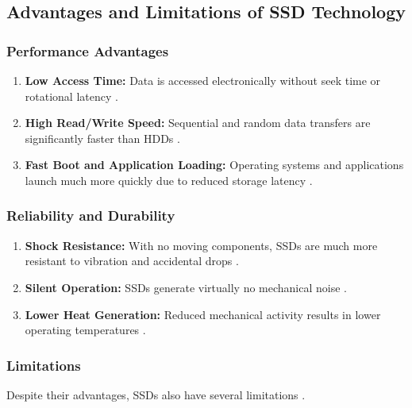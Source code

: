 \subsection{Advantages and Limitations of SSD Technology}

\subsubsection{Performance Advantages}
\begin{enumerate}[label=\roman*.]
    \item \textbf{Low Access Time:} Data is accessed electronically without seek time or rotational latency \cite{openai2026nvmearchitecture}.
    \item \textbf{High Read/Write Speed:} Sequential and random data transfers are significantly faster than HDDs \cite{openai2026nvmearchitecture}.
    \item \textbf{Fast Boot and Application Loading:} Operating systems and applications launch much more quickly due to reduced storage latency \cite{gfg_storage_structure}.
\end{enumerate}

\subsubsection{Reliability and Durability}

\begin{enumerate}[label=\roman*.]
    \item \textbf{Shock Resistance:} With no moving components, SSDs are much more resistant to vibration and accidental drops \cite{lexar_nvme}.
    \item \textbf{Silent Operation:} SSDs generate virtually no mechanical noise \cite{lexar_nvme}.
    \item \textbf{Lower Heat Generation:} Reduced mechanical activity results in lower operating temperatures \cite{lexar_nvme}.
\end{enumerate}

\subsubsection{Limitations}
Despite their advantages, SSDs also have several limitations \cite{gfg_storage_structure}.

